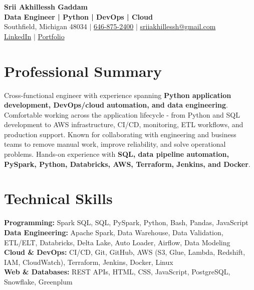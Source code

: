 \documentclass[letterpaper,10pt]{article}
\begin{document}
\fontsize{9.35pt}{10.45pt}\selectfont

\begin{center}
    {\LARGE \textbf{Srii Akhillessh Gaddam}} \\[-1pt]
    \textbf{Data Engineer | Python | DevOps | Cloud} \\[2pt]
    Southfield, Michigan 48034 $|$
    \href{tel:6468752400}{646-875-2400} $|$
    \href{mailto:sriiakhillessh@gmail.com}{sriiakhillessh@gmail.com} \\[1pt]
    \href{https://www.linkedin.com/in/srii-akhiilessh-gaddam-b48668191/}{LinkedIn} $|$
    \href{https://sriiakhillesshg.github.io/portfolio/}{Portfolio}
\end{center}
\vspace{-8pt}

\section{Professional Summary}
\small{Cross-functional engineer with experience spanning \textbf{Python application development, DevOps/cloud automation, and data engineering}. Comfortable working across the application lifecycle - from Python and SQL development to AWS infrastructure, CI/CD, monitoring, ETL workflows, and production support. Known for collaborating with engineering and business teams to remove manual work, improve reliability, and solve operational problems. Hands-on experience with \textbf{SQL, data pipeline automation, PySpark, Python, Databricks, AWS, Terraform, Jenkins, and Docker}.}

\section{Technical Skills}
\small{
\textbf{Programming:} Spark SQL, SQL, PySpark, Python, Bash, Pandas, JavaScript \\
\textbf{Data Engineering:} Apache Spark, Data Warehouse, Data Validation, ETL/ELT, Databricks, Delta Lake, Auto Loader, Airflow, Data Modeling \\
\textbf{Cloud \& DevOps:} CI/CD, Git, GitHub, AWS (S3, Glue, Lambda, Redshift, IAM, CloudWatch), Terraform, Jenkins, Docker, Linux \\
\textbf{Web \& Databases:} REST APIs, HTML, CSS, JavaScript, PostgreSQL, Snowflake, Greenplum
}
\end{document}
